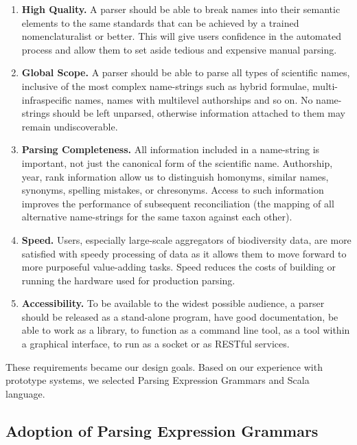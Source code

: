 \documentclass{bmcart}
\begin{document}
\begin{enumerate}

  \item \textbf{High Quality.} A parser should be able to break names into their semantic elements to the same standards that can be achieved by a trained nomenclaturalist or better. This will give users confidence in the automated process and allow them to set aside tedious and expensive manual parsing.

  \item \textbf{Global Scope.} A parser should be able to parse all types of scientific names, inclusive of the most complex name-strings such as hybrid formulae, multi-infraspecific names, names with multilevel authorships and so on. No name-strings should be left unparsed, otherwise information attached to them may remain undiscoverable.

  \item \textbf{Parsing Completeness.} All information included in a name-string is important, not just the canonical form of the scientific name. Authorship, year, rank information allow us to distinguish homonyms, similar names, synonyms, spelling mistakes, or chresonyms. Access to such information improves the performance of subsequent reconciliation (the mapping of all alternative name-strings for the same taxon against each other).

  \item \textbf{Speed.} Users, especially large-scale aggregators of biodiversity data, are more satisfied with speedy processing of data as it allows them to move forward to more purposeful value-adding tasks. Speed reduces the costs of building or running the hardware used for production parsing.

  \item \textbf{Accessibility.} To be available to the widest possible audience, a parser should be released as a stand-alone program, have good documentation, be able to work as a library, to function as a command line tool, as a tool within a graphical interface, to run as a socket or as RESTful services.

\end{enumerate}

These requirements became our design goals. Based on our experience with prototype systems, we selected Parsing Expression Grammars and Scala language.

\subsection*{Adoption of Parsing Expression Grammars}
\end{document}

